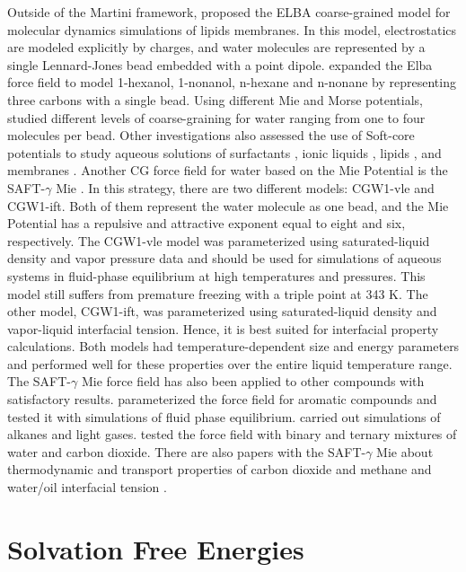 Outside of the Martini framework,  proposed the ELBA coarse-grained model for molecular dynamics simulations of lipids membranes. In this model, electrostatics are modeled explicitly by charges, and water molecules are represented by a single Lennard-Jones bead embedded with a point dipole.  expanded the Elba force field to model 1-hexanol, 1-nonanol, n-hexane and n-nonane by representing three carbons with a single bead. Using different Mie and Morse potentials,  studied different levels of coarse-graining for water ranging from one to four molecules per bead. Other investigations also assessed the use of Soft-core potentials to study aqueous solutions of surfactants \cite{shinoda2007}, ionic liquids \cite{bhargava2009}, lipids \cite{shinoda20102}, and membranes \cite{pantano2009}. Another CG force field for water based on the Mie Potential is the SAFT-$\gamma$ Mie \cite{lobanova2015}. In this strategy, there are two different models: CGW1-vle and CGW1-ift. Both of them represent the water molecule as one bead, and the Mie Potential has a repulsive and attractive exponent equal to eight and six, respectively. The CGW1-vle model was parameterized using saturated-liquid density and vapor pressure data and should be used for simulations of aqueous systems in fluid-phase equilibrium at high temperatures and pressures. This model still suffers from premature freezing with a triple point at 343 K. The other model, CGW1-ift, was parameterized using saturated-liquid density and vapor-liquid interfacial tension. Hence, it is best suited for interfacial property calculations. Both models had temperature-dependent size and energy parameters and performed well for these properties over the entire liquid temperature range. The SAFT-$\gamma$ Mie force field has also been applied to other compounds with satisfactory results.  parameterized the force field for aromatic compounds and tested it with simulations of fluid phase equilibrium.  carried out simulations of alkanes and light gases.  tested the force field with binary and ternary mixtures of water and carbon dioxide. There are also papers with the SAFT-$\gamma$ Mie about thermodynamic and transport properties of carbon dioxide and methane \cite{cassiano1,cassiano2} and water/oil interfacial tension \cite{herdes2017}.  

\section{Solvation Free Energies}


